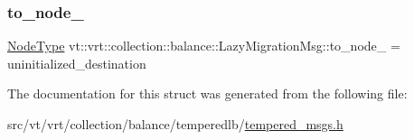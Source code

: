 \subsubsection{\texorpdfstring{to\+\_\+node\+\_\+}{to\_node\_}}
{\footnotesize\ttfamily \hyperlink{namespacevt_a866da9d0efc19c0a1ce79e9e492f47e2}{Node\+Type} vt\+::vrt\+::collection\+::balance\+::\+Lazy\+Migration\+Msg\+::to\+\_\+node\+\_\+ = uninitialized\+\_\+destination\hspace{0.3cm}{\ttfamily [private]}}



The documentation for this struct was generated from the following file\+:\begin{DoxyCompactItemize}
\item 
src/vt/vrt/collection/balance/temperedlb/\hyperlink{tempered__msgs_8h}{tempered\+\_\+msgs.\+h}\end{DoxyCompactItemize}
